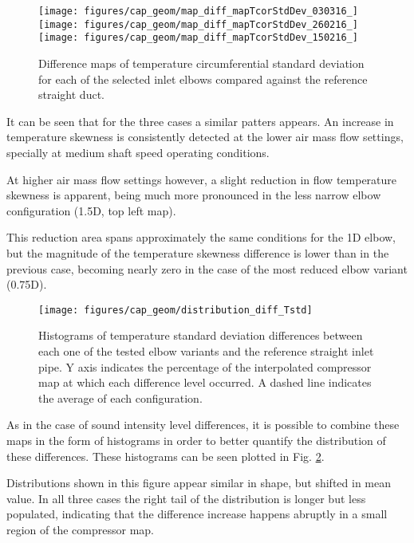 \begin{figure}[tb!]
\centering
\texttt{[image: figures/cap\_geom/map\_diff\_mapTcorStdDev\_030316\_]}\hspace{4mm}
\texttt{[image: figures/cap\_geom/map\_diff\_mapTcorStdDev\_260216\_]}\\[3mm]
\texttt{[image: figures/cap\_geom/map\_diff\_mapTcorStdDev\_150216\_]}\hspace{4mm}
\caption{Difference maps of temperature circumferential standard deviation for each of the selected inlet elbows compared against the reference straight duct.}
\label{fig:map_diff_std}
\end{figure}

It can be seen that for the three cases a similar patters appears. An increase in temperature skewness is consistently detected at the lower air mass flow settings, specially at medium shaft speed operating conditions.

At higher air mass flow settings however, a slight reduction in flow temperature skewness is apparent, being much more pronounced in the less narrow elbow configuration (1.5D, top left map). 

This reduction area spans approximately the same conditions for the 1D elbow, but the magnitude of the temperature skewness difference is lower than in the previous case, becoming nearly zero in the case of the most reduced elbow variant (0.75D).

\begin{figure}[htb!]
\centering
\texttt{[image: figures/cap\_geom/distribution\_diff\_Tstd]}
\caption{Histograms of temperature standard deviation differences between each one of the tested elbow variants and the reference straight inlet pipe. Y axis indicates the percentage of the interpolated compressor map at which each difference level occurred. A dashed line indicates the average of each configuration.}
\label{fig:distribution_diff_std}
\end{figure}

As in the case of sound intensity level differences, it is possible to combine these maps in the form of histograms in order to better quantify the distribution of these differences. These histograms can be seen plotted in Fig. \ref{fig:distribution_diff_std}.

Distributions shown in this figure appear similar in shape, but shifted in mean value. In all three cases the right tail of the distribution is longer but less populated, indicating that the difference increase happens abruptly in a small region of the compressor map. 

